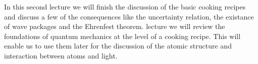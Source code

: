 In this second lecture we will finish the discussion of the basic cooking recipes and discuss a few of the consequences like the uncertainty relation, the existance of wave packages and the Ehrenfest theorem. lecture we will review the foundations of quantum mechanics at the level of a cooking recipe. This will enable us to use them later for the discussion of the atomic structure and interaction between atoms and light.